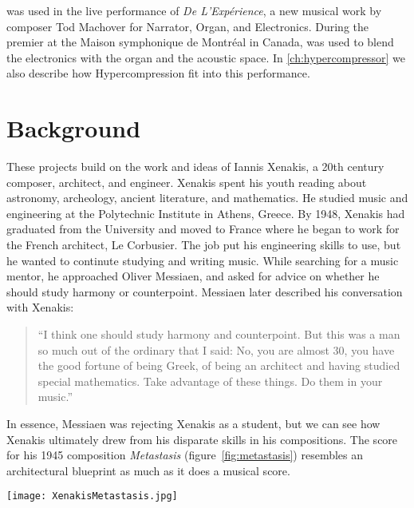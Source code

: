 \thesis was used in the live performance of \textit{De
  L'Exp\'{e}rience}, a new musical work by composer Tod Machover for
Narrator, Organ, and Electronics. During the premier at the Maison
symphonique de Montr\'{e}al in Canada, \thesis was used to blend the
electronics with the organ and the acoustic space. In
\autoref{ch:hypercompressor} we also describe how Hypercompression fit
into this performance.

\section{Background}
\label{sec:background}
These projects build on the work and ideas of Iannis Xenakis, a 20th
century composer, architect, and engineer. Xenakis spent his youth
reading about astronomy, archeology, ancient literature, and
mathematics.\cite[]{Hoffmann2015} He studied music and engineering at
the Polytechnic Institute in Athens, Greece. By 1948, Xenakis had
graduated from the University and moved to France where he began to
work for the French architect, Le Corbusier. The job put his
engineering skills to use, but he wanted to continute studying and
writing music.  While searching for a music mentor, he approached
Oliver Messiaen, and asked for advice on whether he
should study harmony or counterpoint. Messiaen later described his
conversation with Xenakis:
\begin{quotation}``I think one should study harmony and
  counterpoint. But this was a man so much out of the ordinary that I
  said: No, you are almost 30, you have the good fortune of being
  Greek, of being an architect and having studied special
  mathematics. Take advantage of these things. Do them in your
  music.''\cite{Service2013}
\end{quotation}
In essence, Messiaen was rejecting Xenakis as a student, but we can
see how Xenakis ultimately drew from his disparate skills in his
compositions. The score for his 1945 composition \textit{Metastasis}
(figure~\ref{fig:metastasis}) resembles an architectural blueprint as
much as it does a musical score.

\begin{figure*}[h]
  \texttt{[image: XenakisMetastasis.jpg]}
  \caption{Excerpt from Iannis Xenakis' composition,
    \textit{Metastasis} (1954), measures 309-314. This score in this
    image was then transcribed to sheet music for the orchestral
    performance.}
  \label{fig:metastasis}
\end{figure*}

